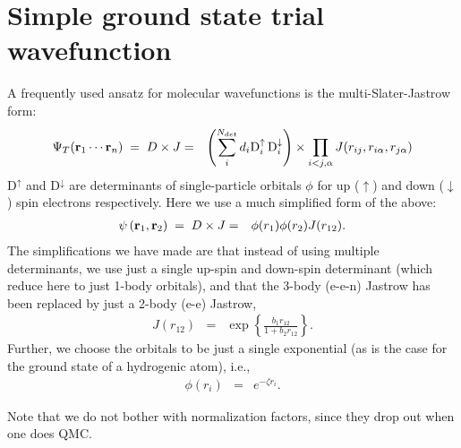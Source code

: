 \documentclass[11pt,aps,prb,amsmath,amssymb,superscriptaddress,notitlepage]{revtex4-1}
\def\beq{\begin{eqnarray}}
\def\eeq{\end{eqnarray}}
\def\rvec{{\bf r}}
\begin{document}
\section{Simple ground state trial wavefunction}

A frequently used ansatz for molecular wavefunctions is the multi-Slater-Jastrow form:
\beq
\Psi_T(\rvec_1 \cdots \rvec_n) \;=\; D \times J &=&\left(
\sum_i^{N_{det}} d_i {\rm D}_i^\uparrow \, {\rm D}_i^\downarrow
\right)\times \prod_{i<j,\alpha} J(r_{ij},r_{i\alpha},r_{j\alpha})
\eeq
D$^\uparrow$ and D$^\downarrow$ are determinants of single-particle
orbitals $\phi$ for up ($\uparrow$) and down ($\downarrow$) spin electrons respectively.
Here we use a much simplified form of the above:
\beq
\psi\left(\rvec_{1},\rvec_{2}\right) \;=\; D \times J
&=& \phi(r_{1})\phi(r_{2})J(r_{12}).
\label{wavefn}
\eeq
The simplifications we have made are that instead of using multiple determinants, we use just
a single up-spin and down-spin determinant (which reduce here to just 1-body orbitals),
and that the 3-body (e-e-n) Jastrow has been replaced by just a 2-body (e-e) Jastrow,
\beq
J\left(r_{12}\right) &=&\exp\left\{ \frac{b_1 r_{12}}{1+b_2 r_{12}}\right\} .
\label{Jastrow}
\eeq
Further, we choose the orbitals to be just a single exponential (as is the case for the ground
state of a hydrogenic atom), i.e.,
\beq
\phi\left(r_{i}\right) &=& e^{-\zeta r_{i}}.
\label{orbital}
\eeq

Note that we do not bother with normalization factors, since they drop out when one does QMC.
\end{document}
